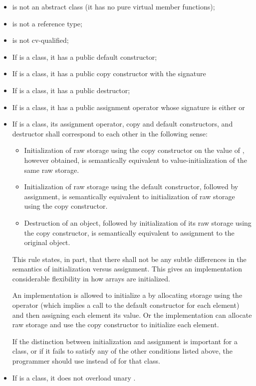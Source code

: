 \begin{itemize}
\item {} is not an abstract class (it has no pure virtual member functions);
\item {} is not a reference type;
\item {} is not cv-qualified;
\item If  is a class, it has a public default constructor;
\item If  is a class, it has a public copy constructor with the signature 
\item If  is a class, it has a public destructor;
\item If  is a class, it has a public assignment operator whose signature is either
or
\item If  is a class, its assignment operator, copy and default constructors,
and destructor shall correspond to each other in the following sense:
 \begin{itemize}
 \item Initialization of raw storage using the copy constructor
   on the value of , however obtained,
   is semantically equivalent to value-initialization of the same raw storage.
 \item Initialization of raw storage using the default constructor,
   followed by assignment,
   is semantically equivalent to initialization of raw storage using the copy constructor.
 \item Destruction of an object,
   followed by initialization of its raw storage using the copy constructor,
    is semantically equivalent to assignment to the original object.
 \end{itemize}

\begin{note}
This rule states, in part, that there shall not be any subtle differences in the semantics
of initialization versus assignment.
This gives an implementation
considerable flexibility in how arrays are initialized.

\begin{example}
An implementation is allowed to initialize a
by allocating storage using the
operator (which
implies a call to the default constructor for each element) and then
assigning each element its value.
Or the implementation can allocate raw
storage and use the copy constructor to initialize each element.
\end{example}

If the distinction between initialization and assignment is important
for a class, or if it fails to satisfy any of
the other conditions listed above, the programmer should use
 instead of
for that class.
\end{note}
\item If  is a class, it does not overload unary
.
\end{itemize}

